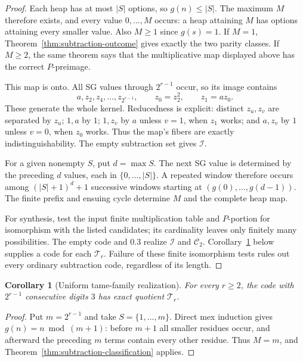 \documentclass[11pt]{article}
\newtheorem{corollary}[theorem]{Corollary}
\theoremstyle{definition}
\theoremstyle{remark}
\begin{document}
\begin{proof}
Each heap has at most $|S|$ options, so $g(n)\le|S|$.  The maximum $M$
therefore exists, and every value $0,\ldots,M$ occurs: a heap attaining
$M$ has options attaining every smaller value.  Also $M\ge1$ since
$g(s)=1$.  If $M=1$, Theorem~\ref{thm:subtraction-outcome} gives exactly
the two parity classes.  If $M\ge2$, the same theorem says that the
multiplicative map displayed above has the correct $P$-preimage.

This map is onto.  All SG values through $2^{r-1}$ occur, so its image
contains
\[
 a,z_2,z_4,\ldots,z_{2^{r-1}},\qquad z_0=z_2^2,\qquad z_1=az_0.
\]  These generate the whole kernel.  Reducedness is explicit:
distinct $z_u,z_v$ are separated by $z_u$; $1,a$ by $1$; $1,z_v$ by $a$
unless $v=1$, when $z_1$ works; and $a,z_v$ by $1$ unless $v=0$, when
$z_0$ works.  Thus the map's fibers are exactly indistinguishability.
The empty subtraction set gives $\mathcal I$.

For a given nonempty $S$, put $d=\max S$.  The next SG value is determined
by the preceding $d$ values, each in $\{0,\ldots,|S|\}$.  A repeated
window therefore occurs among $(|S|+1)^d+1$ successive windows starting at
$(g(0),\ldots,g(d-1))$.  The finite prefix and ensuing cycle determine
$M$ and the complete heap map.

For synthesis, test the input finite multiplication table and $P$-portion
for isomorphism with the listed candidates; its cardinality leaves only
finitely many possibilities.  The empty code and $0.3$ realize
$\mathcal I$ and $\mathcal C_2$.  Corollary~\ref{thm:tame} below supplies
a code for each $\mathcal T_r$.  Failure of these finite isomorphism tests
rules out every ordinary subtraction code, regardless of its length.
\end{proof}

\begin{corollary}[Uniform tame-family realization]\label{thm:tame}
For every $r\ge2$, the code with $2^{r-1}$ consecutive digits $3$ has
exact quotient $\mathcal T_r$.
\end{corollary}

\begin{proof}
Put $m=2^{r-1}$ and take $S=\{1,\ldots,m\}$.  Direct mex induction gives
$g(n)=n\bmod(m+1)$: before $m+1$ all smaller residues occur, and afterward
the preceding $m$ terms contain every other residue.  Thus $M=m$, and
Theorem~\ref{thm:subtraction-classification} applies.
\end{proof}
\end{document}
